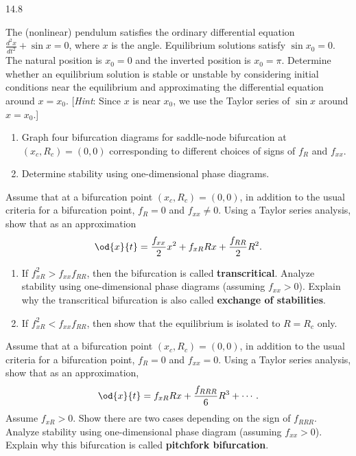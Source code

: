 \begin{exercises}{14.8}
\item The (nonlinear) pendulum satisfies the ordinary differential equation $\frac{d^2x}{dt^2} + \sin x = 0$, where $x$ is the angle. Equilibrium solutions satisfy $\sin x_0 = 0$. The natural position is $x_0 = 0$ and the inverted position is $x_0 = \pi$. Determine whether an equilibrium solution is stable or unstable by considering initial conditions near the equilibrium and approximating the differential equation around $x = x_0$. [\emph{Hint}: Since $x$ is near $x_0$, we use the Taylor series of $\sin x$ around $x = x_0$.]

\item \begin{enumerate}
\item[(a)] Graph four bifurcation diagrams for saddle-node bifurcation at $(x_c, R_c) = (0, 0)$ corresponding to different choices of signs of $f_R$ and $f_{xx}$.
\item[(b)] Determine stability using one-dimensional phase diagrams.
\end{enumerate}

\item Assume that at a bifurcation point $(x_c, R_c) = (0, 0)$, in addition to the usual criteria for a bifurcation point, $f_R = 0$ and $f_{xx} \neq 0$. Using a Taylor series analysis, show that as an approximation
\[
\od{x}{t} = \frac{f_{xx}}{2}x^2 + f_{xR}Rx + \frac{f_{RR}}{2}R^2.
\]
\begin{enumerate}
\item[(a)] If $f_{xR}^2 > f_{xx}f_{RR}$, then the bifurcation is called \textbf{transcritical}. Analyze stability using one-dimensional phase diagrams (assuming $f_{xx} > 0$). Explain why the transcritical bifurcation is also called \textbf{exchange of stabilities}.
\item[(b)] If $f_{xR}^2 < f_{xx}f_{RR}$, then show that the equilibrium is isolated to $R = R_c$ only.
\end{enumerate}

\item Assume that at a bifurcation point $(x_c, R_c) = (0, 0)$, in addition to the usual criteria for a bifurcation point, $f_R = 0$ and $f_{xx} = 0$. Using a Taylor series analysis, show that as an approximation,
\[
\od{x}{t} = f_{xR}Rx + \frac{f_{RRR}}{6}R^3 + \cdots.
\]
Assume $f_{xR} > 0$. Show there are two cases depending on the sign of $f_{RRR}$. Analyze stability using one-dimensional phase diagram (assuming $f_{xx} > 0$). Explain why this bifurcation is called \textbf{pitchfork bifurcation}.


\end{exercises}
